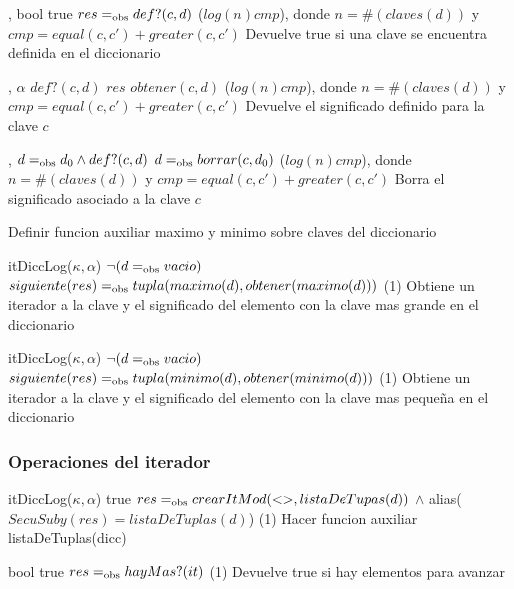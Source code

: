 {   ,
    }
{bool}
{true}
{$res =_{\mathrm{obs}} def?(c, d)$}
{\bigo($log(n)cmp$), donde $n = \#(claves(d))$ y $cmp = equal(c, c')+greater(c, c')$}
{}
{Devuelve true si una clave se encuentra definida en el diccionario}

{   ,
    }
{$\alpha$}
{$def?(c, d)$}
{$res$ \igobs $obtener(c, d)$}
{\bigo($log(n)cmp$), donde $n = \#(claves(d))$ y $cmp = equal(c, c')+greater(c, c')$}
{}
{Devuelve el significado definido para la clave $c$}

{   ,
    }
{}
{$d =_{\mathrm{obs}} d_0 \land def?(c, d)$}
{$d =_{\mathrm{obs}} borrar(c, d_0)$}
{\bigo($log(n)cmp$), donde $n = \#(claves(d))$ y $cmp = equal(c, c')+greater(c, c')$}
{}
{Borra el significado asociado a la clave $c$}


\cuidado Definir funcion auxiliar maximo y minimo sobre claves del diccionario

{   }
{itDiccLog($\kappa, \alpha$)}
{$\neg (d =_{\mathrm{obs}} vacio)$}
{$siguiente(res) =_{\mathrm{obs}} tupla(maximo(d), obtener(maximo(d)))$}
{\bigo(1)}
{}
{Obtiene un iterador a la clave y el significado del elemento con la clave 
    mas grande en el diccionario}

{   }
{itDiccLog($\kappa, \alpha$)}
{$\neg (d =_{\mathrm{obs}} vacio)$}
{$siguiente(res) =_{\mathrm{obs}} tupla(minimo(d), obtener(minimo(d)))$}
{\bigo(1)}
{}
{Obtiene un iterador a la clave y el significado del elemento con la clave 
    mas pequeña en el diccionario}



\subsubsection{Operaciones del iterador}

{   }
{itDiccLog($\kappa, \alpha$)}
{true}
{$res =_{\mathrm{obs}} crearItMod(<>, listaDeTupas(d))$ $\land$ alias($SecuSuby(res) = listaDeTuplas(d)$)}
{\bigo(1)}
{\cuidado Hacer funcion auxiliar listaDeTuplas(dicc)}
{}

{    }
{bool}
{true}
{$res =_{\mathrm{obs}} hayMas?(it)$}
{\bigo(1)}
{}
{Devuelve true si hay elementos para avanzar}

